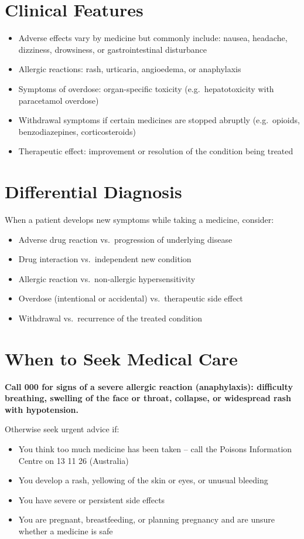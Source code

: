 \section*{Clinical Features}
\begin{itemize}
    \item Adverse effects vary by medicine but commonly include: nausea, headache, dizziness, drowsiness, or gastrointestinal disturbance
    \item Allergic reactions: rash, urticaria, angioedema, or anaphylaxis
    \item Symptoms of overdose: organ-specific toxicity (e.g.\ hepatotoxicity with paracetamol overdose)
    \item Withdrawal symptoms if certain medicines are stopped abruptly (e.g.\ opioids, benzodiazepines, corticosteroids)
    \item Therapeutic effect: improvement or resolution of the condition being treated
\end{itemize}

\section*{Differential Diagnosis}
When a patient develops new symptoms while taking a medicine, consider:
\begin{itemize}
    \item Adverse drug reaction vs.\ progression of underlying disease
    \item Drug interaction vs.\ independent new condition
    \item Allergic reaction vs.\ non-allergic hypersensitivity
    \item Overdose (intentional or accidental) vs.\ therapeutic side effect
    \item Withdrawal vs.\ recurrence of the treated condition
\end{itemize}

\section*{When to Seek Medical Care}
\textbf{Call 000 for signs of a severe allergic reaction (anaphylaxis): difficulty breathing, swelling of the face or throat, collapse, or widespread rash with hypotension.}

Otherwise seek urgent advice if:
\begin{itemize}
    \item You think too much medicine has been taken -- call the Poisons Information Centre on 13 11 26 (Australia)
    \item You develop a rash, yellowing of the skin or eyes, or unusual bleeding
    \item You have severe or persistent side effects
    \item You are pregnant, breastfeeding, or planning pregnancy and are unsure whether a medicine is safe
\end{itemize}

